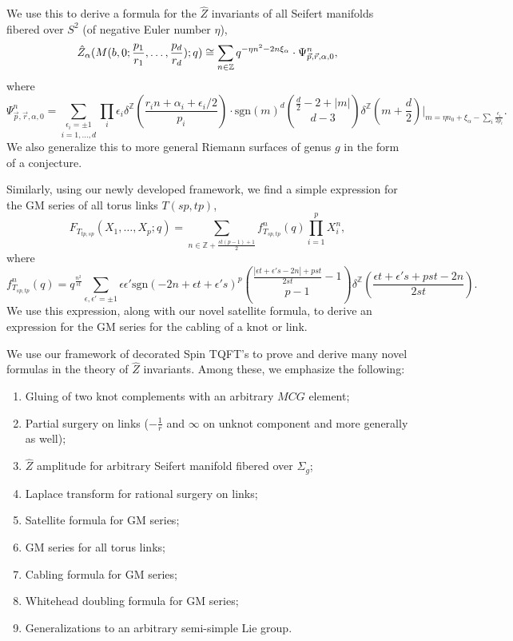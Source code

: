 \documentclass{article}
\numberwithin{corollary}{theorem}
\numberwithin{corollary}{proposition}
\begin{document}
We use this to derive a formula for the $\hat{Z}$ invariants of all Seifert manifolds fibered over $S^2$ (of negative Euler number $\eta$),
$$\Hat{Z}_{\alpha}(M(b,0;\frac{p_1}{r_1},\ldots,\frac{p_d}{r_d});q) \cong \sum_{n\in \mathbb{Z}}q^{-\eta n^2 -2n \xi_\alpha} \cdot \Psi^n_{\Vec{p},\Vec{r},\alpha,0},$$
where 
$$\Psi^n_{\Vec{p},\Vec{r},\alpha,0} = \underset{i=1,\ldots,d}{\sum_{\epsilon_i=\pm1}} \prod_i \epsilon_i \delta^\mathbb{Z}\left( \frac{r_i n +\alpha_i+\epsilon_i/2}{p_i}\right)\cdot \mathrm{sgn}(m)^d \binom{\frac{d}{2}-2+|m|}{d-3}\delta^\mathbb{Z}\left(m+\frac{d}{2}\right)\bigg|_{m = \eta n_0 + \xi_\alpha- \sum_i\frac{\epsilon_i}{2p_i}}.$$
We also generalize this to more general Riemann surfaces of genus $g$ in the form of a conjecture. 

Similarly, using our newly developed framework, we find a simple expression for the GM series of all torus links $T(sp,tp)$,
    $$F_{T_{tp,sp}}(X_1,\ldots,X_p;q) = \sum_{n\in \mathbb{Z}+\frac{st(p-1) +1}{2}} f^n_{T_{sp,tp}}(q) \prod^p_{i=1}X_i^n,$$
where    
$$f^n_{T_{sp,tp}}(q) = q^{\frac{n^2}{st}}\sum_{\epsilon,\epsilon' = \pm1} \epsilon \epsilon' \mathrm{sgn}(-2n +\epsilon t +\epsilon' s )^p \binom{\frac{|\epsilon t+\epsilon' s -2n|+pst}{2st}-1}{ p-1} \delta^\mathbb{Z}\left(\frac{\epsilon t+\epsilon' s+pst -2n}{2st}\right) .$$
We use this expression, along with our novel satellite formula, to derive an expression for the GM series for the cabling of a knot or link.

We use our framework of decorated Spin TQFT's to prove and derive many novel formulas in the theory of $\hat{Z}$ invariants. Among these, we emphasize the following: 
\begin{enumerate}
    \item Gluing of two knot complements with an arbitrary $MCG$ element;
    \item Partial surgery on links ($-\frac{1}{r}$ and $\infty$ on unknot component and more generally as well);
    \item $\hat{Z}$ amplitude for arbitrary Seifert manifold fibered over $\Sigma_g$;
    \item Laplace transform for rational surgery on links;
    \item Satellite formula for GM series;
    \item GM series for all torus links; 
    \item Cabling formula for GM series;
    \item Whitehead doubling formula for GM series;
    \item Generalizations to an arbitrary semi-simple Lie group.
\end{enumerate}
\end{document}
